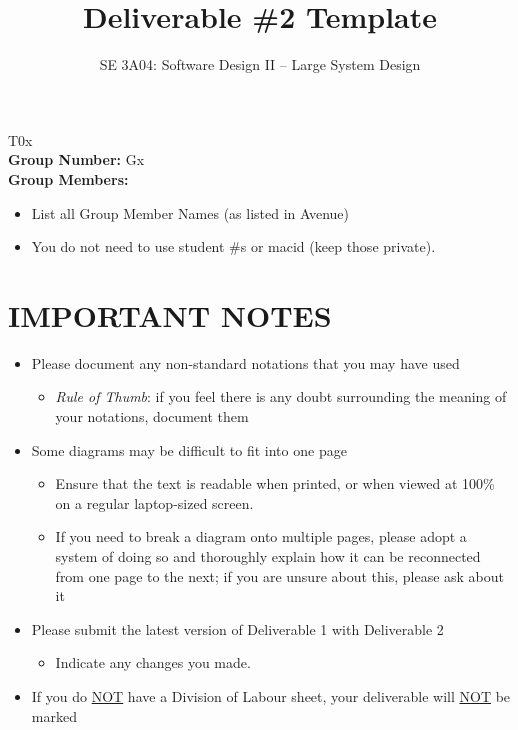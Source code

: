 \documentclass[]{article}
\title{Deliverable \#2 Template}
\author{SE 3A04: Software Design II -- Large System Design}
\date{}
\begin{document}
\maketitle	
{} T0x\\
{\bf Group Number:} Gx \\
{\bf Group Members:} 
\begin{itemize}
	\item List all Group Member Names (as listed in Avenue)
	\item You do not need to use student \#s or macid (keep those private).
\end{itemize}

\section*{IMPORTANT NOTES}
\begin{itemize}
	\item Please document any non-standard notations that you may have used
	\begin{itemize}
		\item \emph{Rule of Thumb}: if you feel there is any doubt surrounding the meaning of your notations, document them
	\end{itemize}
	\item Some diagrams may be difficult to fit into one page
	\begin{itemize}
		\item Ensure that the text is readable when printed, or when viewed at 100\% on a regular laptop-sized screen.
		\item If you need to break a diagram onto multiple pages, please adopt a system of doing so and thoroughly explain how it can be reconnected from one page to the next; if you are unsure about this, please ask about it
	\end{itemize}
	\item Please submit the latest version of Deliverable 1 with Deliverable 2
	\begin{itemize}
		\item Indicate any changes you made.
	\end{itemize}
	\item If you do \underline{NOT} have a Division of Labour sheet, your deliverable will \underline{NOT} be marked
\end{itemize}
\end{document}
